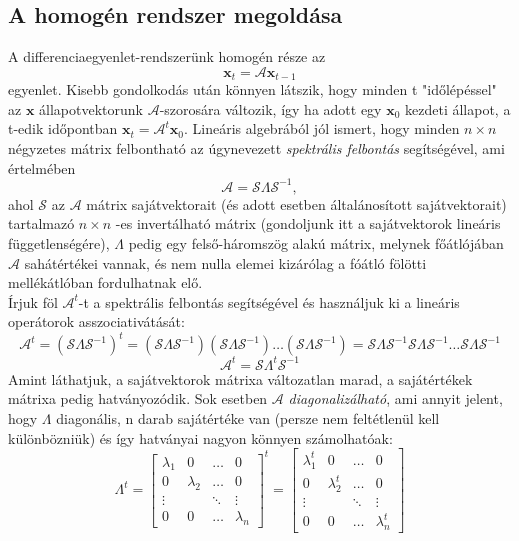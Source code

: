 \documentclass[14p]{article}
\begin{document}
\subsection{A homogén rendszer megoldása}
A differenciaegyenlet-rendszerünk homogén része az 
\[
	\pmb{x}_{t} = \mathcal{A}\pmb{x}_{t-1}
\]
egyenlet. Kisebb gondolkodás után könnyen látszik, hogy minden t "időlépéssel" az $\pmb{x}$ állapotvektorunk $\mathcal{A}$-szorosára változik, így ha adott egy $\pmb{x}_{0}$ kezdeti állapot, a t-edik időpontban $\pmb{x}_{t} = \mathcal{A}^{t}\pmb{x}_{0}$. Lineáris algebrából jól ismert, hogy minden $n \times n$ négyzetes mátrix felbontható az úgynevezett \emph{spektrális felbontás} segítségével, ami értelmében
\[
	\mathcal{A} = \mathcal{S}\Lambda\mathcal{S}^{-1} ,
\]
ahol $\mathcal{S}$ az $\mathcal{A}$ mátrix sajátvektorait (és adott esetben általánosított sajátvektorait) tartalmazó $n \times n$ -es invertálható mátrix (gondoljunk itt a sajátvektorok lineáris függetlenségére), $\Lambda$ pedig egy felső-háromszög alakú mátrix, melynek főátlójában $\mathcal{A}$ sahátértékei vannak, és nem nulla elemei kizárólag a fóátló fölötti mellékátlóban fordulhatnak elő.
\\
Írjuk föl $\mathcal{A}^{t}$-t a spektrális felbontás segítségével és használjuk ki a lineáris operátorok asszociativátását:
\[
	\mathcal{A}^t = (\mathcal{S}\Lambda\mathcal{S}^{-1})^t = (\mathcal{S}\Lambda\mathcal{S}^{-1})(\mathcal{S}\Lambda\mathcal{S}^{-1}) \dots (\mathcal{S}\Lambda\mathcal{S}^{-1}) = \mathcal{S}\Lambda\mathcal{S}^{-1}\mathcal{S}\Lambda\mathcal{S}^{-1} \dots \mathcal{S}\Lambda\mathcal{S}^{-1}
\]
\[
	\mathcal{A}^t = \mathcal{S}\Lambda^t\mathcal{S}^{-1}
\]
Amint láthatjuk, a sajátvektorok mátrixa változatlan marad, a sajátértékek mátrixa pedig hatványozódik. Sok esetben $\mathcal{A}$ \emph{diagonalizálható}, ami annyit jelent, hogy $\Lambda$ diagonális, n darab sajátértéke van (persze nem feltétlenül kell különbözniük) és így hatványai nagyon könnyen számolhatóak:
\[
	\Lambda^t = 
		\begin{bmatrix}
		\lambda_1 & 0 & \dots & 0 \\
		0 & \lambda_2 & \dots & 0 \\
		\vdots & &\ddots & \vdots \\
		0 & 0 & \dots & \lambda_n
		\end{bmatrix}
		^{t}
		=
		\begin{bmatrix}
		\lambda^{t}_1 & 0 & \dots & 0 \\
		0 & \lambda^{t}_2 & \dots & 0 \\
		\vdots & & \ddots & \vdots \\
		0 & 0 & \dots & \lambda^{t}_n
		\end{bmatrix}
\]
\end{document}
